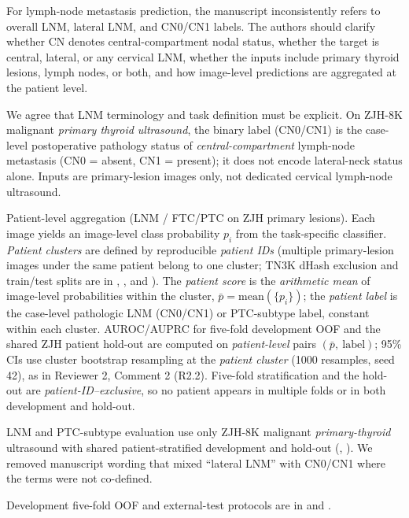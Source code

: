 \begin{reviewercomment}
For lymph-node metastasis prediction, the manuscript inconsistently refers to overall LNM, lateral LNM, and CN0/CN1 labels. The authors should clarify whether CN denotes central-compartment nodal status, whether the target is central, lateral, or any cervical LNM, whether the inputs include primary thyroid lesions, lymph nodes, or both, and how image-level predictions are aggregated at the patient level.
\end{reviewercomment}
\begin{authorresponse}
We agree that LNM terminology and task definition must be explicit. On ZJH-8K malignant \emph{primary thyroid ultrasound}, the binary label (CN0/CN1) is the case-level postoperative pathology status of \emph{central-compartment} lymph-node metastasis (CN0 = absent, CN1 = present); it does not encode lateral-neck status alone. Inputs are primary-lesion images only, not dedicated cervical lymph-node ultrasound.\par
Patient-level aggregation (LNM / FTC/PTC on ZJH primary lesions). Each image yields an image-level class probability $p_i$ from the task-specific classifier. \emph{Patient clusters} are defined by reproducible \emph{patient IDs} (multiple primary-lesion images under the same patient belong to one cluster; TN3K dHash exclusion and train/test splits are in , , and ). The \emph{patient score} is the \emph{arithmetic mean} of image-level probabilities within the cluster, $\bar p=\mathrm{mean}(\{p_i\})$; the \emph{patient label} is the case-level pathologic LNM (CN0/CN1) or PTC-subtype label, constant within each cluster. AUROC/AUPRC for five-fold development OOF and the shared ZJH patient hold-out are computed on \emph{patient-level} pairs $(\bar p,\ \mathrm{label})$; 95\% CIs use cluster bootstrap resampling at the \emph{patient cluster} (1000 resamples, seed 42), as in Reviewer 2, Comment 2 (R2.2). Five-fold stratification and the hold-out are \emph{patient-ID--exclusive}, so no patient appears in multiple folds or in both development and hold-out.\par
LNM and PTC-subtype evaluation use only ZJH-8K malignant \emph{primary-thyroid} ultrasound with shared patient-stratified development and hold-out (, ). We removed manuscript wording that mixed ``lateral LNM'' with CN0/CN1 where the terms were not co-defined.\par
Development five-fold OOF and external-test protocols are in  and .\par
\par
\end{authorresponse}

